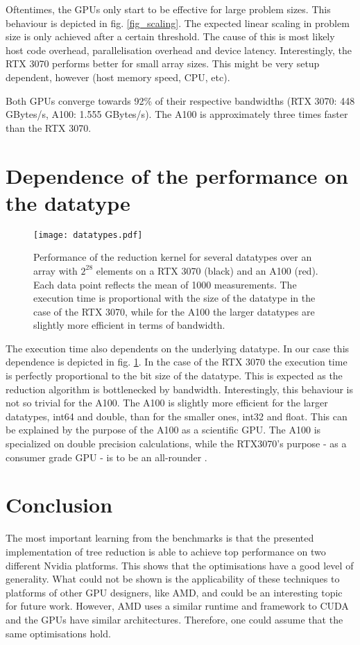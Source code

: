 Oftentimes, the GPUs only start to be effective for large problem sizes.
This behaviour is depicted in fig. \ref{fig_scaling}.
The expected linear scaling in problem size is only achieved after a certain threshold.
The cause of this is most likely host code overhead, parallelisation overhead and device latency.
Interestingly, the RTX 3070 performs better for small array sizes.
This might be very setup dependent, however (host memory speed, CPU, etc).

Both GPUs converge towards 92\% of their respective bandwidths (RTX 3070: 448 GBytes/s, A100: 1.555 GBytes/s).
The A100 is approximately three times faster than the RTX 3070.

\section{Dependence of the performance on the datatype}

\begin{figure} \label{fig_datatypes}
    \centering
    \texttt{[image: datatypes.pdf]}
    \caption{
        Performance of the reduction kernel for several datatypes over an array with \( 2^{28} \) elements on a RTX 3070 (black) and an A100 (red).
        Each data point reflects the mean of 1000 measurements.
        The execution time is proportional with the size of the datatype in the case of the RTX 3070,
        while for the A100 the larger datatypes are slightly more efficient in terms of bandwidth.
    }
\end{figure}

The execution time also dependents on the underlying datatype.
In our case this dependence is depicted in fig. \ref{fig_datatypes}.
In the case of the RTX 3070 the execution time is perfectly proportional to the bit size of the datatype.
This is expected as the reduction algorithm is bottlenecked by bandwidth.
Interestingly, this behaviour is not so trivial for the A100.
The A100 is slightly more efficient for the larger datatypes, int64 and double, than for the smaller ones, int32 and float.
This can be explained by the purpose of the A100 as a scientific GPU.
The A100 is specialized on double precision calculations, while the RTX3070's purpose - as a consumer grade GPU - is to be an all-rounder \cite{programming_guide}.

\section{Conclusion}
The most important learning from the benchmarks is that the presented implementation of tree reduction is able to achieve top performance on two different Nvidia platforms.
This shows that the optimisations have a good level of generality. 
What could not be shown is the applicability of these techniques to platforms of other GPU designers, like AMD, and could be an interesting topic for future work.
However, AMD uses a similar runtime and framework to CUDA and the GPUs have similar architectures.
Therefore, one could assume that the same optimisations hold.
